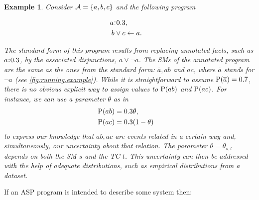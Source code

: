 \documentclass[adraft,copyright,creativecommons]{eptcs}
\newtheorem{example}{Example}
\newcommand{\at}[1]{\ensuremath{\!\del{#1}}}
\newcommand{\co}[1]{\ensuremath{\overline{#1}}}
\newcommand{\fml}[1]{\ensuremath{{\cal #1}}}
\newcommand{\pr}[1]{\ensuremath{\mathrm{P}\at{#1}}}
\newcommand{\probfact}[2]{\ensuremath{#2\mkern-4mu:\mkern-4mu#1}}
\newcounter{remark}
\newcommand{\note}[1]{
    \stepcounter{remark}%
    {\!\!\color{red}/}\footnotemark[\arabic{remark}]\!\!%
    \footnotetext[\arabic{remark}]{{\color{red}/}#1}
}
\begin{document}
\begin{example}\label{running.example}
    Consider $\fml{A} = \set{a, b, c}$ and the following program

    \begin{equation}
        \begin{aligned}
            \probfact{0.3}{a} & ,\cr
            b \vee c          & \leftarrow a.
        \end{aligned}
        \label{eq:example.1}
    \end{equation}

    The \emph{standard form} of this program results from replacing annotated facts, such as $\probfact{0.3}{a}$, by the associated disjunctions, $a \vee \neg a$. The \aclp{SM} of the annotated program are the same as the ones from the standard form:  $\co{a}, ab$ and $ac$, where $\co{a}$ stands for $\neg a$ (see \cref{fig:running.example}). While it is straightforward to assume $\pr{\co{a}}=0.7$, there is no obvious explicit way to assign values to $\pr{ab}$ and $\pr{ac}$. For instance, we can use a parameter $\theta$ as in
    $$
        \begin{aligned}
            \pr{ab} & = 0.3 \theta,\cr
            \pr{ac} & = 0.3 (1 - \theta)
        \end{aligned}
    $$
    to express our knowledge that $ab,ac$ are events related in a certain way and, simultaneously, our uncertainty about that relation. The pa\-ra\-me\-ter $\theta=\theta_{s,t}$ depends on both the \acl{SM} $s$ and the \acl{TC} $t$. This uncertainty can then be addressed with the help of adequate distributions, such as empirical distributions from a dataset.
\end{example}

If an \ac{ASP} program is intended to describe some system then:
\end{document}
